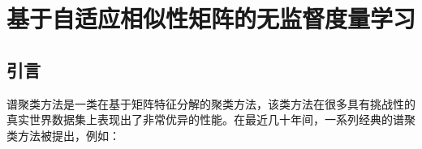 \chapter{基于自适应相似性矩阵的无监督度量学习}
\section{引言}
谱聚类方法是一类在基于矩阵特征分解的聚类方法，该类方法在很多具有挑战性的真实世界数据集上表现出了非常优异的性能。在最近几十年间，一系列经典的谱聚类方法被提出，例如：